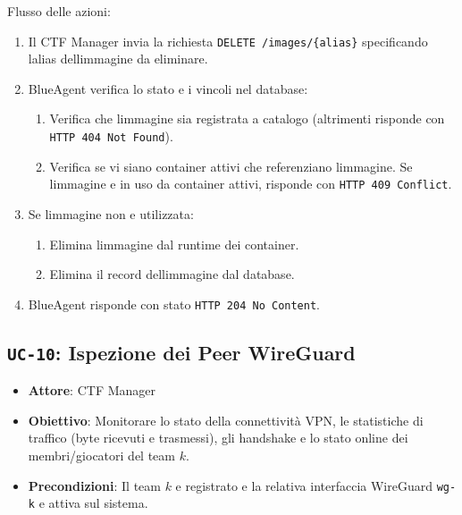 Flusso delle azioni:

\begin{enumerate}
\def\labelenumi{\arabic{enumi}.}
\tightlist
\item
  Il CTF Manager invia la richiesta
  \passthrough{\lstinline!DELETE /images/\{alias\}!} specificando
  l\textquotesingle alias dell\textquotesingle immagine da eliminare.
\item
  BlueAgent verifica lo stato e i vincoli nel database:

  \begin{enumerate}
  \def\labelenumii{\arabic{enumii}.}
  \tightlist
  \item
    Verifica che l\textquotesingle immagine sia registrata a catalogo
    (altrimenti risponde con
    \passthrough{\lstinline!HTTP 404 Not Found!}).
  \item
    Verifica se vi siano container attivi che referenziano
    l\textquotesingle immagine. Se l\textquotesingle immagine
    e\textquotesingle{} in uso da container attivi, risponde con
    \passthrough{\lstinline!HTTP 409 Conflict!}.
  \end{enumerate}
\item
  Se l\textquotesingle immagine non e\textquotesingle{} utilizzata:

  \begin{enumerate}
  \def\labelenumii{\arabic{enumii}.}
  \tightlist
  \item
    Elimina l\textquotesingle immagine dal runtime dei container.
  \item
    Elimina il record dell\textquotesingle immagine dal database.
  \end{enumerate}
\item
  BlueAgent risponde con stato
  \passthrough{\lstinline!HTTP 204 No Content!}.
\end{enumerate}

\subsection{\texorpdfstring{\texttt{UC-10}: Ispezione dei Peer
WireGuard}{UC-10: Ispezione dei Peer WireGuard}}\label{uc-10-ispezione-dei-peer-wireguard}

\begin{itemize}
\tightlist
\item
  \textbf{Attore}: CTF Manager
\item
  \textbf{Obiettivo}: Monitorare lo stato della connettività VPN, le
  statistiche di traffico (byte ricevuti e trasmessi), gli handshake e
  lo stato online dei membri/giocatori del team \(k\).
\item
  \textbf{Precondizioni}: Il team \(k\) e\textquotesingle{} registrato e
  la relativa interfaccia WireGuard \passthrough{\lstinline!wg-k!}
  e\textquotesingle{} attiva sul sistema.
\end{itemize}

